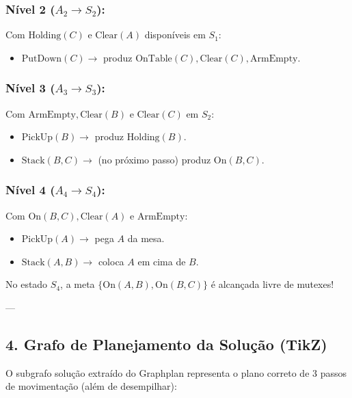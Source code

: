 \documentclass[a4paper,12pt]{article}
\begin{document}
\subsubsection*{Nível 2 ($A_2 \to S_2$):}
Com $\text{Holding}(C)$ e $\text{Clear}(A)$ disponíveis em $S_1$:
\begin{itemize}
	\item $\text{PutDown}(C) \to$ produz $\text{OnTable}(C), \text{Clear}(C), \text{ArmEmpty}$.
\end{itemize}

\subsubsection*{Nível 3 ($A_3 \to S_3$):}
Com $\text{ArmEmpty}, \text{Clear}(B)$ e $\text{Clear}(C)$ em $S_2$:
\begin{itemize}
	\item $\text{PickUp}(B) \to$ produz $\text{Holding}(B)$.
	\item $\text{Stack}(B, C) \to$ (no próximo passo) produz $\text{On}(B, C)$.
\end{itemize}

\subsubsection*{Nível 4 ($A_4 \to S_4$):}
Com $\text{On}(B, C), \text{Clear}(A)$ e $\text{ArmEmpty}$:
\begin{itemize}
	\item $\text{PickUp}(A) \to$ pega $A$ da mesa.
	\item $\text{Stack}(A, B) \to$ coloca $A$ em cima de $B$.
\end{itemize}

No estado $S_4$, a meta $\{\text{On}(A, B), \text{On}(B, C)\}$ é alcançada livre de mutexes!

---

\subsection*{4. Grafo de Planejamento da Solução (TikZ)}

O subgrafo solução extraído do Graphplan representa o plano correto de 3 passos de movimentação (além de desempilhar):
\end{document}
